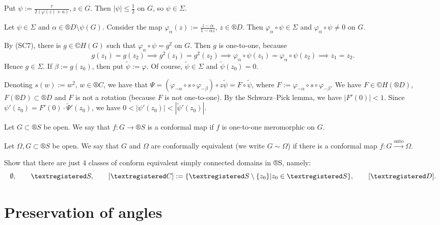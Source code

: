 \documentclass[12pt]{article}					%
\begin{document}
\begin{veta}[Riemann]
\begin{dukazin}
		Put $ψ := \frac{r}{2(φ(z) + a)}, z \in G$. Then $|ψ| ≤ \frac{1}{2}$ on $G$, so $ψ \in Σ$.
	\end{dukazin}

	\begin{dukazin}
		Let $ψ \in Σ$ and $α \in ®D \setminus ψ(G)$. Consider the map $φ_α(z) := \frac{z - α}{1 - \overline{α}z}$, $z \in ®D$. Then $φ_α ∘ ψ \in Σ$ and $φ_α ∘ ψ ≠ 0$ on $G$.

		By (SC7), there is $g \in ©H(G)$ such that $φ_α ∘ ψ = g^2$ on $G$. Then $g$ is one-to-one, because
		$$ g(z_1) = g(z_2) \implies g^2(z_1) = g^2(z_2) \implies φ_α ∘ ψ(z_1) = φ_α ∘ ψ(z_2) \implies z_1 = z_2. $$
		Hence $g \in Σ$. If $β := g(z_0)$, then put $\tilde ψ := φ$. Of course, $\tilde ψ \in Σ$ and $\tilde ψ(z_0) = 0$.

		Denoting $s(w) := w^2$, $w \in ®C$, we have that $Ψ = (φ_{-α} ∘ s ∘ φ_{-β}) ∘ z\tilde ψ = F ∘ \tilde ψ$, where $F := φ_{-α} ∘ s ∘ φ_{-β}$. We have $F \in ©H(®D)$, $F(®D) \subset ®D$ and $F$ is not a rotation (because $F$ is not one-to-one). By the Schwarz–Pick lemma, we have $|F'(0)| < 1$. Since $ψ'(z_0) = F'(0)·\tilde Ψ'(z_0)$, we have $0 < |ψ'(z_0)| < |\tilde ψ'(z_0)|$.
	\end{dukazin}
\end{veta}

\begin{definice}
	Let $G \subset ®S$ be open. We say that $f: G \rightarrow ®S$ is a conformal map if $f$ is one-to-one meromorphic on $G$.
\end{definice}

\begin{definice}
	Let $Ω, G \subset ®S$ be open. We say that $G$ and $Ω$ are conformally equivalent (we write $G \sim Ω$) if there is a conformal map $f: G \overset{\text{onto}}\rightarrow Ω$.
\end{definice}

\begin{priklad}
	Show that there are just 4 classes of conform equivalent simply connected domains in ®S, namely:
	$$ \O, \qquad ®S, \qquad [®C] := \{®S \setminus \{z_0\} | z_0 \in ®S\}, \qquad [®D]. $$
\end{priklad}


\section{Preservation of angles}
\end{document}
